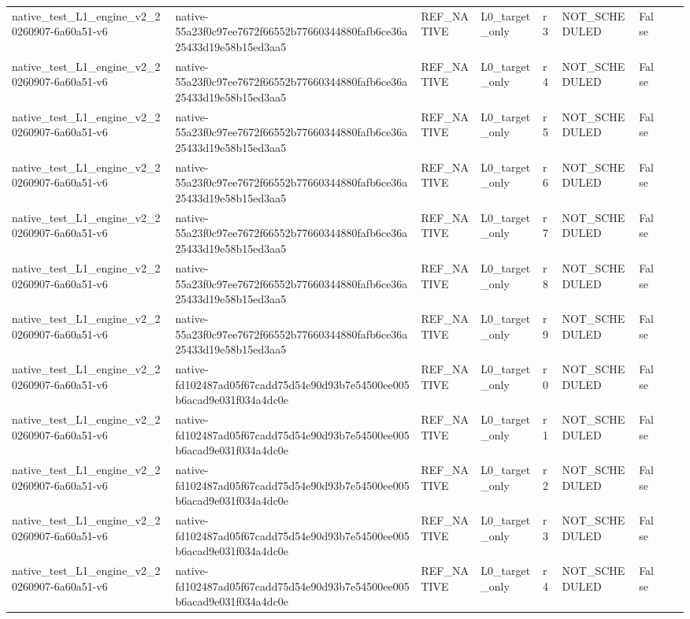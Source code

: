 \begin{tabular}{lllllllll}
native\_test\_L1\_engine\_v2\_20260907-6a60a51-v6 & native-55a23f0c97ee7672f66552b77660344880fafb6ce36a25433d19e58b15ed3aa5 & REF\_NATIVE & L0\_target\_only & r3 & NOT\_SCHEDULED & False &  &  \\
native\_test\_L1\_engine\_v2\_20260907-6a60a51-v6 & native-55a23f0c97ee7672f66552b77660344880fafb6ce36a25433d19e58b15ed3aa5 & REF\_NATIVE & L0\_target\_only & r4 & NOT\_SCHEDULED & False &  &  \\
native\_test\_L1\_engine\_v2\_20260907-6a60a51-v6 & native-55a23f0c97ee7672f66552b77660344880fafb6ce36a25433d19e58b15ed3aa5 & REF\_NATIVE & L0\_target\_only & r5 & NOT\_SCHEDULED & False &  &  \\
native\_test\_L1\_engine\_v2\_20260907-6a60a51-v6 & native-55a23f0c97ee7672f66552b77660344880fafb6ce36a25433d19e58b15ed3aa5 & REF\_NATIVE & L0\_target\_only & r6 & NOT\_SCHEDULED & False &  &  \\
native\_test\_L1\_engine\_v2\_20260907-6a60a51-v6 & native-55a23f0c97ee7672f66552b77660344880fafb6ce36a25433d19e58b15ed3aa5 & REF\_NATIVE & L0\_target\_only & r7 & NOT\_SCHEDULED & False &  &  \\
native\_test\_L1\_engine\_v2\_20260907-6a60a51-v6 & native-55a23f0c97ee7672f66552b77660344880fafb6ce36a25433d19e58b15ed3aa5 & REF\_NATIVE & L0\_target\_only & r8 & NOT\_SCHEDULED & False &  &  \\
native\_test\_L1\_engine\_v2\_20260907-6a60a51-v6 & native-55a23f0c97ee7672f66552b77660344880fafb6ce36a25433d19e58b15ed3aa5 & REF\_NATIVE & L0\_target\_only & r9 & NOT\_SCHEDULED & False &  &  \\
native\_test\_L1\_engine\_v2\_20260907-6a60a51-v6 & native-fd102487ad05f67cadd75d54e90d93b7e54500ee005b6acad9e031f034a4dc0e & REF\_NATIVE & L0\_target\_only & r0 & NOT\_SCHEDULED & False &  &  \\
native\_test\_L1\_engine\_v2\_20260907-6a60a51-v6 & native-fd102487ad05f67cadd75d54e90d93b7e54500ee005b6acad9e031f034a4dc0e & REF\_NATIVE & L0\_target\_only & r1 & NOT\_SCHEDULED & False &  &  \\
native\_test\_L1\_engine\_v2\_20260907-6a60a51-v6 & native-fd102487ad05f67cadd75d54e90d93b7e54500ee005b6acad9e031f034a4dc0e & REF\_NATIVE & L0\_target\_only & r2 & NOT\_SCHEDULED & False &  &  \\
native\_test\_L1\_engine\_v2\_20260907-6a60a51-v6 & native-fd102487ad05f67cadd75d54e90d93b7e54500ee005b6acad9e031f034a4dc0e & REF\_NATIVE & L0\_target\_only & r3 & NOT\_SCHEDULED & False &  &  \\
native\_test\_L1\_engine\_v2\_20260907-6a60a51-v6 & native-fd102487ad05f67cadd75d54e90d93b7e54500ee005b6acad9e031f034a4dc0e & REF\_NATIVE & L0\_target\_only & r4 & NOT\_SCHEDULED & False &  &  \\

\end{tabular}
